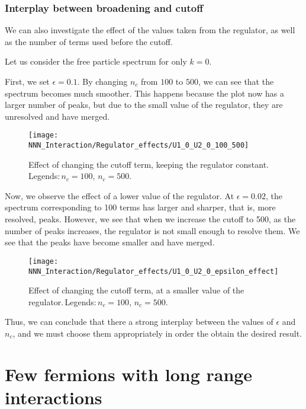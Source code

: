 \documentclass[a4paper, 11pt]{report}
\begin{document}
\subsection{Interplay between broadening and cutoff}
We can also investigate the effect of the values taken from the regulator, as well as the number of terms used before the cutoff.

Let us consider the free particle spectrum for only $k=0$.

First, we set $\epsilon = 0.1$. By changing $n^{}_{c}$ from $100$ to $500$, we can see that the spectrum becomes much smoother. This happens because the plot now has a larger number of peaks, but due to the small value of the regulator, they are unresolved and have merged. 

\begin{figure}[h!]
\centering
\texttt{[image: NNN\_Interaction/Regulator\_effects/U1\_0\_U2\_0\_100\_500]}
\caption{Effect of changing the cutoff term, keeping the regulator constant.\,Legends:\,{\color{red}$n^{}_{c} = 100$}, {\color{blue}$n^{}_{c} = 500$}.}
\label{fig:u10u20100500}
\end{figure}

Now, we observe the effect of a lower value of the regulator. At $\epsilon = 0.02$, the spectrum corresponding to 100 terms has larger and sharper, that is, more resolved, peaks. However, we see that when we increase the cutoff to 500, as the number of peaks increases, the regulator is not small enough to resolve them. We see that the peaks have become smaller and have merged.

\begin{figure}[h!]
\centering
\texttt{[image: NNN\_Interaction/Regulator\_effects/U1\_0\_U2\_0\_epsilon\_effect]}
\caption{Effect of changing the cutoff term, at a smaller value of  the regulator.\,Legends:\,{\color{red}$n^{}_{c} = 100$}, {\color{blue}$n^{}_{c} = 500$}.}
\label{fig:u10u20epsiloneffect}
\end{figure}

Thus, we can conclude that there a strong interplay between the values of $\epsilon$ and $n^{}_{c}$, and we must choose them appropriately in order the obtain the desired result.


\pagebreak
\newpage
\chapter{Few fermions with long range interactions}\label{sec:LongRange}\label{chap:few_fermion}
\end{document}

